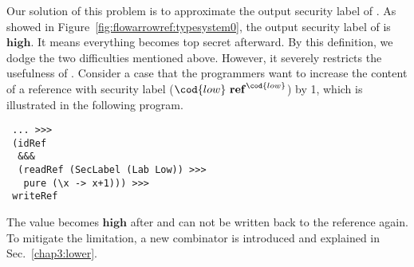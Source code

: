 Our solution of this problem is to approximate the output security label of .
As showed in Figure~\ref{fig:flowarrowref:typesystem0}, the output security label of  is
$\mathbf{high}$. It means everything becomes top secret afterward. By this definition, we dodge the
two difficulties mentioned above. However, it severely restricts the usefulness of . 
Consider a case that the programmers want to increase the content of a reference with security label
($\cod{low}~\mathbf{ref}^{\cod{low}}$) by 1, which is illustrated in the following program.
\begin{verbatim}
 ... >>>
 (idRef 
  &&& 
  (readRef (SecLabel (Lab Low)) >>>
   pure (\x -> x+1))) >>>
 writeRef
\end{verbatim}
The value  becomes $\mathbf{high}$ after  and can not be written back to the reference
again. To mitigate the limitation, a new combinator  is introduced and explained in
Sec.~\ref{chap3:lower}.

 
